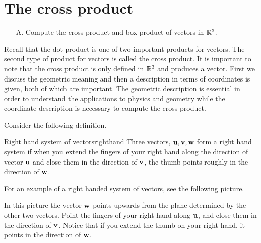 \section{The cross product}

\begin{outcome}

\begin{enumerate}

\item[A.] Compute the cross product and box product of vectors in $\mathbb{R}^3$.
\end{enumerate}
\end{outcome}

Recall that the dot product is one of two important products for vectors. The second type of product for vectors is called the cross product. It is important to note that the 
cross product is only defined in $\mathbb{R}^{3}$ and produces a vector. 
First we discuss the geometric meaning and then a description in terms of
coordinates is given, both of which are important. 
The geometric description is essential in order to understand the
applications to physics and geometry while the coordinate description is necessary to compute the cross product.

Consider the following definition.

\begin{definition}{Right hand system of vectors}{righthand}
Three vectors, ${\bf u},{\bf v},{\bf w}$ form a right hand system if when you
extend the fingers of your right hand along the direction of vector ${\bf u}$ and
close them in the direction of ${\bf v}$, the thumb points roughly in the
direction of ${\bf w}$.
\end{definition}

For an example of a right handed system of vectors, see the following
picture.

\begin{center}
\end{center}

In this picture the vector ${\bf w}$ points upwards from the plane
determined by the other two vectors. Point the fingers of your right hand along ${\bf u}$, and 
close them in the direction of ${\bf v}$. Notice that if you extend the thumb on your right hand,
it points in the direction of ${\bf w}$.


